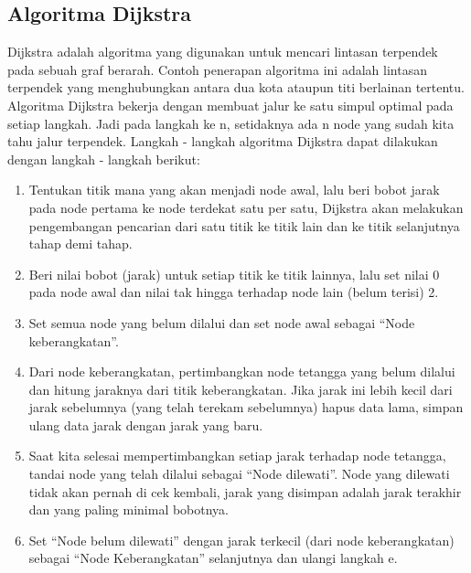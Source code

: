 \documentclass[conference]{IEEEtran}
\begin{document}
\subsection{Algoritma Dijkstra}
Dijkstra adalah algoritma yang digunakan untuk mencari lintasan terpendek pada sebuah graf berarah. Contoh penerapan algoritma ini adalah lintasan terpendek yang menghubungkan antara dua kota ataupun titi berlainan tertentu. Algoritma Dijkstra bekerja dengan membuat jalur ke satu simpul optimal pada setiap langkah. Jadi pada langkah ke n, setidaknya ada n node yang sudah kita tahu jalur terpendek. Langkah - langkah algoritma Dijkstra dapat dilakukan dengan langkah - langkah berikut:
\begin{enumerate}
	\item Tentukan titik mana yang akan menjadi node awal, lalu beri bobot jarak pada node pertama ke node terdekat satu per satu, Dijkstra akan melakukan pengembangan pencarian dari satu titik ke titik lain dan ke titik selanjutnya tahap demi tahap.
	\item Beri nilai bobot (jarak) untuk setiap titik ke titik lainnya, lalu set nilai 0 pada node awal dan nilai tak hingga terhadap node lain (belum terisi) 2.
	\item Set semua node yang belum dilalui  dan set node awal sebagai “Node keberangkatan”.
	\item Dari node keberangkatan, pertimbangkan node tetangga yang belum dilalui dan hitung jaraknya dari titik keberangkatan. Jika jarak ini lebih kecil dari jarak sebelumnya (yang telah terekam sebelumnya) hapus data lama, simpan ulang data jarak dengan jarak yang baru.
	\item Saat kita selesai mempertimbangkan setiap jarak terhadap node tetangga, tandai node yang telah dilalui sebagai “Node dilewati”. Node yang dilewati tidak akan pernah di cek kembali, jarak yang disimpan adalah jarak terakhir dan yang paling minimal bobotnya.
	\item Set “Node belum dilewati” dengan jarak terkecil (dari node keberangkatan) sebagai “Node Keberangkatan” selanjutnya dan ulangi langkah e.
\end{enumerate}
\break
\end{document}
